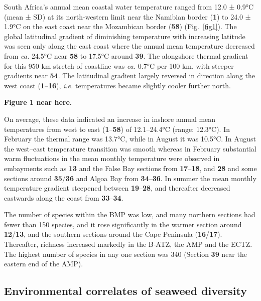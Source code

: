 \documentclass[utf8]{frontiersSCNS} %
\begin{document}
South Africa's annual mean coastal water temperature ranged from 12.0 ± 0.9°C (mean ± SD) at its north-western limit near the Namibian border (\textbf{1}) to 24.0 ± 1.9°C on the east coast near the Mozambican border (\textbf{58}) (Fig.~\ref{fig1}). The global latitudinal gradient of diminishing temperature with increasing latitude was seen only along the east coast where the annual mean temperature decreased from \emph{ca.} 24.5°C near \textbf{58} to 17.5°C around \textbf{39}. The alongshore thermal gradient for this 950 km stretch of coastline was \emph{ca.} 0.7°C per 100 km, with steeper gradients near \textbf{54}. The latitudinal gradient largely reversed in direction along the west coast (\textbf{1}--\textbf{16}), \emph{i.e.} temperatures became slightly cooler further north.

\textbf{Figure 1 near here.}

On average, these data indicated an increase in inshore annual mean temperatures from west to east (\textbf{1}--\textbf{58}) of 12.1--24.4°C (range: 12.3°C). In February the thermal range was 13.7°C, while in August it was 10.5°C. In August the west--east temperature transition was smooth whereas in February substantial warm fluctuations in the mean monthly temperature were observed in embayments such as \textbf{13} and the False Bay sections from \textbf{17}--\textbf{18}, and \textbf{28} and some sections around \textbf{35}/\textbf{36} and Algoa Bay from \textbf{34}--\textbf{36}. In summer the mean monthly temperature gradient steepened between \textbf{19}--\textbf{28}, and thereafter decreased eastwards along the coast from \textbf{33}--\textbf{34}.

The number of species within the BMP was low, and many northern sections had fewer than 150 species, and it rose significantly in the warmer section around \textbf{12}/\textbf{13}, and the southern sections around the Cape Peninsula (\textbf{16}/\textbf{17}). Thereafter, richness increased markedly in the B-ATZ, the AMP and the ECTZ. The highest number of species in any one section was 340 (Section \textbf{39} near the eastern end of the AMP).

\subsection{Environmental correlates of seaweed diversity}
\end{document}
